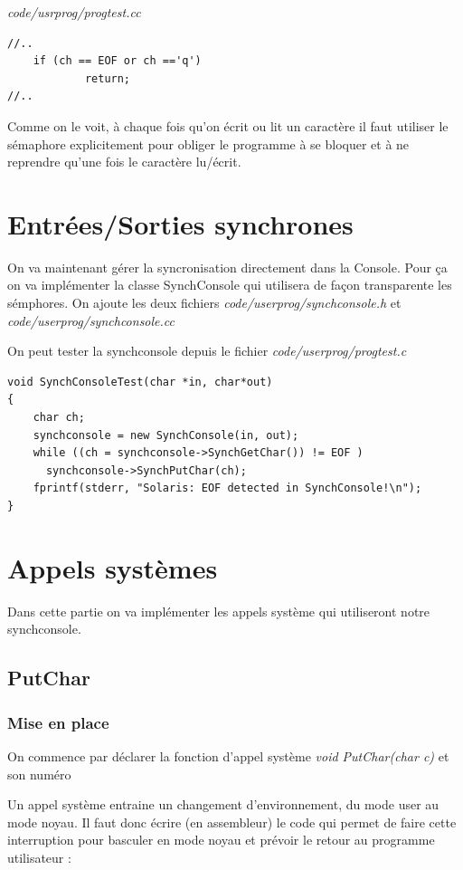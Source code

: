 \documentclass[a4paper,10pt]{article}
\begin{document}
\textit{code/usrprog/progtest.cc}
\begin{lstlisting}
//..
    if (ch == EOF or ch =='q')
            return;
//..
\end{lstlisting}

Comme on le voit, à chaque fois qu'on écrit ou lit un caractère il faut
utiliser le sémaphore explicitement pour obliger le programme à se bloquer et à
ne
reprendre qu'une fois le caractère lu/écrit.

\section{Entrées/Sorties synchrones}
On va maintenant gérer la syncronisation directement dans la Console. Pour ça
on va implémenter la classe SynchConsole qui utilisera de façon
transparente les sémphores. On ajoute les deux fichiers
\textit{code/userprog/synchconsole.h} et \textit{code/userprog/synchconsole.cc}

On peut tester la synchconsole depuis le fichier
\textit{code/userprog/progtest.c}

\begin{lstlisting}
void SynchConsoleTest(char *in, char*out)
{
    char ch;
    synchconsole = new SynchConsole(in, out);
    while ((ch = synchconsole->SynchGetChar()) != EOF )
      synchconsole->SynchPutChar(ch);
    fprintf(stderr, "Solaris: EOF detected in SynchConsole!\n");
}
\end{lstlisting}


\section{Appels systèmes}
Dans cette partie on va implémenter les appels système qui utiliseront notre
synchconsole.
\subsection{PutChar}
\subsubsection{Mise en place}
On commence par déclarer la fonction d'appel système \textit{void PutChar(char
c)} et son numéro

Un appel système entraine un changement d'environnement, du mode user au mode
noyau. Il faut donc écrire (en assembleur) le code qui permet de faire cette
interruption pour basculer en mode noyau et prévoir le retour au programme
utilisateur :
\end{document}

